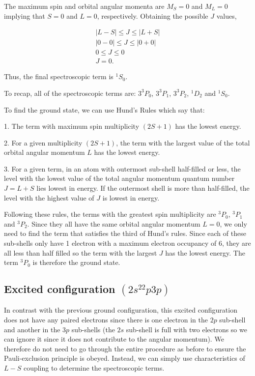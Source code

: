 \documentclass[12pt]{article}
\begin{document}
The maximum spin and orbital angular momenta are $M_S=0$ and $M_L=0$ implying that $S=0$ and $L=0$, respectively. Obtaining the possible $J$ values, 

\begin{align*}
|L-S| \leq J \leq |L+S| \\
|0-0| \leq J \leq |0+0| \\
0 \leq J \leq 0 \\
J = 0.
\end{align*}

Thus, the final spectroscopic term is $^1S_0$.

To recap, all of the spectroscopic terms are: $3^3P_0$, $3^3P_1$, $3^3P_2$, $^1D_2$ and $^1S_0$.

To find the ground state, we can use Hund's Rules which say that:

1. The term with maximum spin multiplicity $(2S+1)$ has the lowest energy.

2. For a given multiplicity $(2S+1)$, the term with the largest value of the total orbital angular momentum $L$ has the lowest energy.

3. For a given term, in an atom with outermost sub-shell half-filled or less, the level with the lowest value of the total angular momentum quantum number $J = L+S$ lies lowest in energy. If the outermost shell is more than half-filled, the level with the highest value of $J$ is lowest in energy.

Following these rules, the terms with the greatest spin multiplicity are $^3P_0$, $^3P_1$ and $^3P_2$. Since they all have the same orbital angular momentum $L=0$, we only need to find the term that satisfies the third of Hund's rules. Since each of these sub-shells only have 1 electron with a maximum electron occupancy of 6, they are all less than half filled so the term with the largest $J$ has the lowest energy. The term $^3P_0$ is therefore the ground state.

\subsection*{Excited configuration $(2s^22p3p)$}

In contrast with the previous ground configuration, this excited configuration does not have any paired electrons since there is one electron in the $2p$ sub-shell and another in the $3p$ sub-shells (the $2s$ sub-shell is full with two electrons so we can ignore it since it does not contribute to the angular momentum). We therefore do not need to go through the entire procedure as before to ensure the Pauli-exclusion principle is obeyed. Instead, we can simply use characteristics of $L-S$ coupling to determine the spectroscopic terms. 
\end{document}
